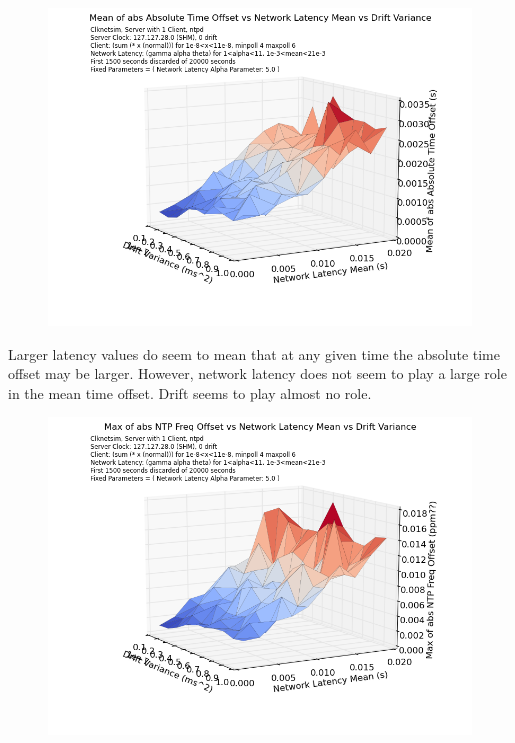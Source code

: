 \begin{figure}[h]
  \includegraphics[width=1\linewidth]{mean_abs_time-mean_latency-drift_var.png}
\end{figure}

Larger latency values do seem to mean that at any given time the
absolute time offset may be larger. However, network latency does not
seem to play a large role in the mean time offset. Drift seems to play
almost no role.



\begin{figure}[h]
  \includegraphics[width=1\linewidth]{max_abs_freq-mean_latency-drift_var.png}
\end{figure}

